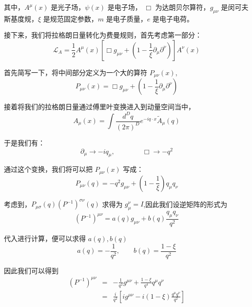 \documentclass{article}
\begin{document}
其中，$A^{\mu}(x)$ 是光子场，$\psi(x)$ 是电子场， $\Box$ 为达朗贝尔算符，$g_{\mu\nu}$ 是闵可夫斯基度规，$\xi$ 是规范固定参数，$m$ 是电子质量，$e$ 是电子电荷。

接下来，我们将拉格朗日量转化为费曼规则，首先考虑第一部分：
\begin{equation}
    \mathcal{L}_{A} = \frac{1}{2}A^{\mu}(x) \left[\Box g_{\mu\nu} + \left(1 - \frac{1}{\xi} \partial_{\mu}\partial^{\nu}\right)\right]A^{\nu}(x)
\end{equation}

首先简写一下，将中间部分定义为一个大的算符 $P_{\mu\nu}(x)$,
\begin{equation}
    P_{\mu\nu}(x) = \Box g_{\mu\nu} + \left(1 - \frac{1}{\xi} \partial_{\mu}\partial^{\nu}\right)
\end{equation}

接着将我们的拉格朗日量通过傅里叶变换进入到动量空间当中，
\begin{equation}
    A_{\mu}(x) = \int \frac{d^{D}q}{\left(2\pi\right)^D} e^{-iq\cdot x}\tilde{A}_{\mu}(q)
\end{equation}

于是我们有：
\begin{equation}
    \partial_{\mu} \to -iq_{\mu},\qquad\qquad \Box \to -q^2
\end{equation}

通过这个变换，我们将可以把 $P_{\mu\nu}(x)$ 写成：
\begin{equation}
    P_{\mu\nu}(q) = -q^2 g_{\mu\nu} + \left(1 - \frac{1}{\xi}\right)q_{\mu}q_{\nu}
\end{equation}

考虑到，$P_{\mu\sigma}(q)\left(P^{-1}\right)^{\sigma\nu}(q)$ 求得为 $g_\mu^\nu = I$,因此我们设逆矩阵的形式为
\begin{equation}
    (P^{-1})^{\mu\nu} = a(q)g_{\mu\nu} + b(q)\frac{q_{\mu}q_{\nu}}{q^2}
\end{equation}

代入进行计算，便可以求得 $a(q),b(q)$
\begin{equation}
    a(q) = -\frac{1}{q^2},\qquad b(q) = \frac{1 - \xi}{q^2}
\end{equation}

因此我们可以得到
\begin{eqnarray}
    (P^{-1})^{\mu\nu} &=& -\frac{1}{q^2}g^{\mu\nu} + \frac{1 - \xi}{q^4}q^{\mu}q^{\nu} \\
    &=& \frac{i}{q^2}\left[ig^{\mu\nu} - i\left(1 - \xi\right)\frac{q^{\mu}q^{\nu}}{q^2}\right]
\end{eqnarray}
\end{document}
